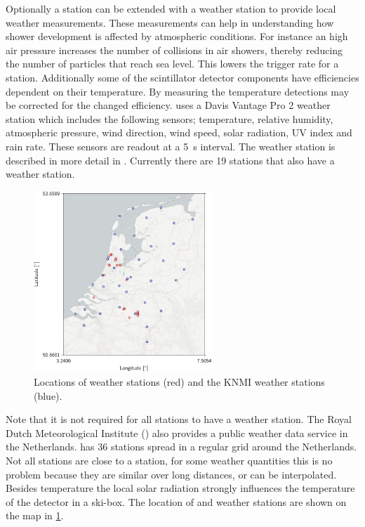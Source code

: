 Optionally a \hisparc station can be extended with a weather station to provide local weather measurements. These measurements can help in understanding how shower development is affected by atmospheric conditions. For instance an high air pressure increases the number of collisions in air showers, thereby reducing the number of particles that reach sea level. This lowers the trigger rate for a station. Additionally some of the scintillator detector components have efficiencies dependent on their temperature. By measuring the temperature detections may be corrected for the changed efficiency. \hisparc uses a Davis Vantage Pro 2 weather station \cite{davis2012vantagepro} which includes the following sensors; temperature, relative humidity, atmospheric pressure, wind direction, wind speed, solar radiation, UV index and rain rate. These sensors are readout at a \SI{5}{\second} interval. The weather station is described in more detail in \cite{devries2012weather}. Currently there are 19 \hisparc stations that also have a weather station.

\begin{figure}
    \centering
    \includegraphics[width=0.6\textwidth]
                    {plots/station/map_weather_knmi}
    \caption{Locations of \hisparc weather stations (red) and the KNMI weather stations (blue).}
    \label{fig:map_weather_knmi}
\end{figure}

Note that it is not required for all stations to have a weather station. The Royal Dutch Meteorological Institute (\knmi) also provides a public weather data service in the Netherlands. \knmi has 36 stations spread in a regular grid around the Netherlands. Not all \hisparc stations are close to a \knmi station, for some weather quantities this is no problem because they are similar over long distances, or can be interpolated. Besides temperature the local solar radiation strongly influences the temperature of the detector in a ski-box. The location of \hisparc and \knmi weather stations are shown on the map in \cref{fig:map_weather_knmi}.


